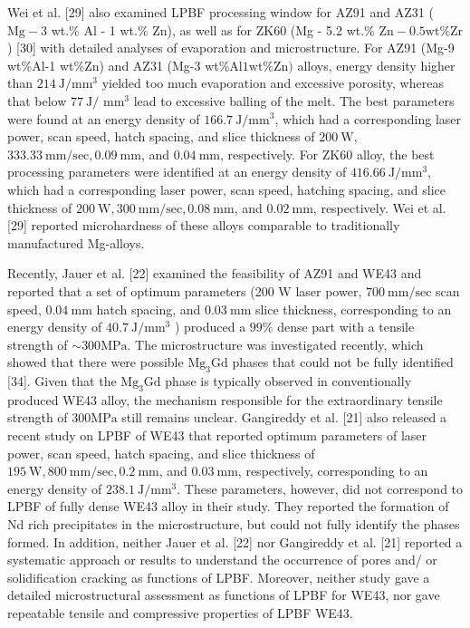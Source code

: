 \documentclass[10pt]{article}
\begin{document}
Wei et al. [29] also examined LPBF processing window for AZ91 and AZ31 ( $\mathrm{Mg}-3$ wt.\% Al - 1 wt.\% Zn), as well as for ZK60 (Mg - 5.2 wt.\% $\mathrm{Zn}-0.5 \mathrm{wt} \% \mathrm{Zr}$ ) [30] with detailed analyses of evaporation and microstructure. For AZ91 (Mg-9 wt\%Al-1 wt\%Zn) and AZ31 (Mg-3 wt\%Al$1 \mathrm{wt} \% \mathrm{Zn})$ alloys, energy density higher than $214 \mathrm{~J} / \mathrm{mm}^{3}$ yielded too much evaporation and excessive porosity, whereas that below $77 \mathrm{~J} /$ $\mathrm{mm}^{3}$ lead to excessive balling of the melt. The best parameters were found at an energy density of $166.7 \mathrm{~J} / \mathrm{mm}^{3}$, which had a corresponding laser power, scan speed, hatch spacing, and slice thickness of $200 \mathrm{~W}$, $333.33 \mathrm{~mm} / \mathrm{sec}, 0.09 \mathrm{~mm}$, and $0.04 \mathrm{~mm}$, respectively. For ZK60 alloy, the best processing parameters were identified at an energy density of $416.66 \mathrm{~J} / \mathrm{mm}^{3}$, which had a corresponding laser power, scan speed, hatching spacing, and slice thickness of $200 \mathrm{~W}, 300 \mathrm{~mm} / \mathrm{sec}, 0.08 \mathrm{~mm}$, and $0.02 \mathrm{~mm}$, respectively. Wei et al. [29] reported microhardness of these alloys comparable to traditionally manufactured Mg-alloys.

Recently, Jauer et al. [22] examined the feasibility of AZ91 and WE43 and reported that a set of optimum parameters (200 W laser power, $700 \mathrm{~mm} / \mathrm{sec}$ scan speed, $0.04 \mathrm{~mm}$ hatch spacing, and $0.03 \mathrm{~mm}$ slice thickness, corresponding to an energy density of $40.7 \mathrm{~J} / \mathrm{mm}^{3}$ ) produced a $99 \%$ dense part with a tensile strength of $\sim 300 \mathrm{MPa}$. The microstructure was investigated recently, which showed that there were possible $\mathrm{Mg}_{3} \mathrm{Gd}$ phases that could not be fully identified [34]. Given that the $\mathrm{Mg}_{3} \mathrm{Gd}$ phase is typically observed in conventionally produced WE43 alloy, the mechanism responsible for the extraordinary tensile strength of $300 \mathrm{MPa}$ still remains unclear. Gangireddy et al. [21] also released a recent study on LPBF of WE43 that reported optimum parameters of laser power, scan speed, hatch spacing, and slice thickness of $195 \mathrm{~W}, 800 \mathrm{~mm} / \mathrm{sec}, 0.2 \mathrm{~mm}$, and $0.03 \mathrm{~mm}$, respectively, corresponding to an energy density of $238.1 \mathrm{~J} / \mathrm{mm}^{3}$. These parameters, however, did not correspond to LPBF of fully dense WE43 alloy in their study. They reported the formation of Nd rich precipitates in the microstructure, but could not fully identify the phases formed. In addition, neither Jauer et al. [22] nor Gangireddy et al. [21] reported a systematic approach or results to understand the occurrence of pores and/ or solidification cracking as functions of LPBF. Moreover, neither study gave a detailed microstructural assessment as functions of LPBF for WE43, nor gave repeatable tensile and compressive properties of LPBF WE43.
\end{document}
